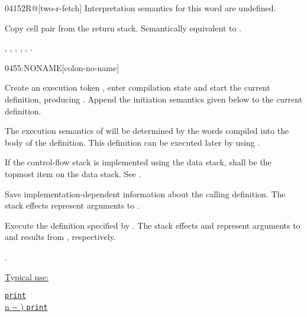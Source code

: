 \begin{worddef}{0415}{2R@}[two-r-fetch]
\interpret
	Interpretation semantics for this word are undefined.

\execute

	Copy cell pair  from the return stack.
	Semantically equivalent to   
	  .

\see {},
	,
	,
	,
	,
	.
\end{worddef}


\begin{worddef}{0455}{:NONAME}[colon-no-name]
\item {}

	Create an execution token , enter compilation state
	and start the current definition, producing .
	Append the initiation semantics given below to the current
	definition.

	The execution semantics of  will be determined by the
	words compiled into the body of the definition. This definition
	can be executed later by using  .

	If the control-flow stack is implemented using the data stack,
	 shall be the topmost item on the data stack.
	See .

\init

	Save implementation-dependent information 
	about the calling definition. The stack effects 
	represent arguments to .

\execute[xt]

	Execute the definition specified by . The stack
	effects  and  represent arguments to
	and results from , respectively.

\see {}.

	\begin{rationale} %
\cbstart{}
		\uline{Typical use:}

		\tab \uline{ \texttt{print}} \\[2ex]
		\tab \uline{  n -{}- )  \word{;}  \texttt{print}}


\end{rationale}
\end{worddef}
